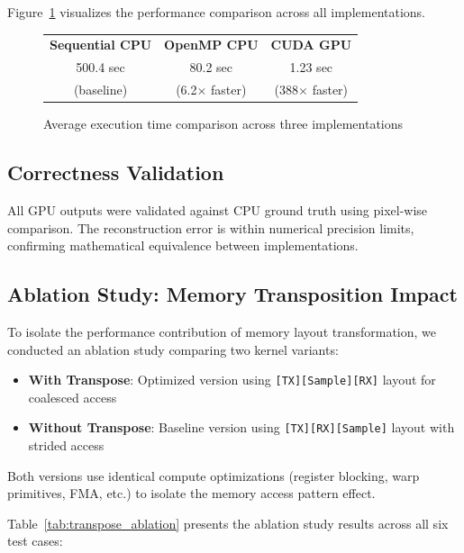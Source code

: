 \documentclass{article}
\begin{document}
Figure~\ref{fig:performance_comparison} visualizes the performance comparison across all implementations.

\begin{figure}[H]
    \centering
    \begin{tabular}{ccc}
        \textbf{Sequential CPU} & \textbf{OpenMP CPU} & \textbf{CUDA GPU} \\
        500.4 sec & 80.2 sec & 1.23 sec \\
        (baseline) & (6.2$\times$ faster) & (388$\times$ faster) \\
    \end{tabular}
    \caption{Average execution time comparison across three implementations}
    \label{fig:performance_comparison}
\end{figure}

\subsection{Correctness Validation}

All GPU outputs were validated against CPU ground truth using pixel-wise comparison. The reconstruction error is within numerical precision limits, confirming mathematical equivalence between implementations.

\subsection{Ablation Study: Memory Transposition Impact}

To isolate the performance contribution of memory layout transformation, we conducted an ablation study comparing two kernel variants:
\begin{itemize}
    \item \textbf{With Transpose}: Optimized version using \texttt{[TX][Sample][RX]} layout for coalesced access
    \item \textbf{Without Transpose}: Baseline version using \texttt{[TX][RX][Sample]} layout with strided access
\end{itemize}

Both versions use identical compute optimizations (register blocking, warp primitives, FMA, etc.) to isolate the memory access pattern effect.

Table~\ref{tab:transpose_ablation} presents the ablation study results across all six test cases:
\end{document}
